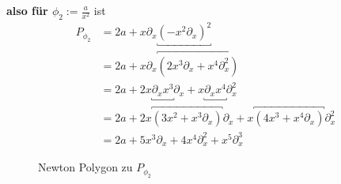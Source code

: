 \textbf{also für $\phi_2:=\frac{a}{x^2}$} ist
\begin{align*}
P_{\phi_2} &=2a+x\partial_x\underbracket{(-x^2\partial_x)^{2}}\\
           &=2a +x\partial_x \overbracket{(2x^3\partial_x+x^4\partial_x^2)} \\
           &=2a
             +2x\underbracket{\partial_xx^3}\partial_x
             +x\underbracket{\partial_xx^4}\partial_x^2 \\
           &=2a
             +2x\overbracket{(3x^2+x^3\partial_x)}\partial_x
             +x\overbracket{(4x^3+x^4\partial_x)}\partial_x^2 \\
           &=2a+5x^3\partial_x+4x^{4}\partial_x^2+x^5\partial_x^3
\end{align*}
\begin{figure}[H]
\caption{Newton Polygon zu $P_{\phi_2}$}
\begin{center}
\end{center}
\end{figure}

